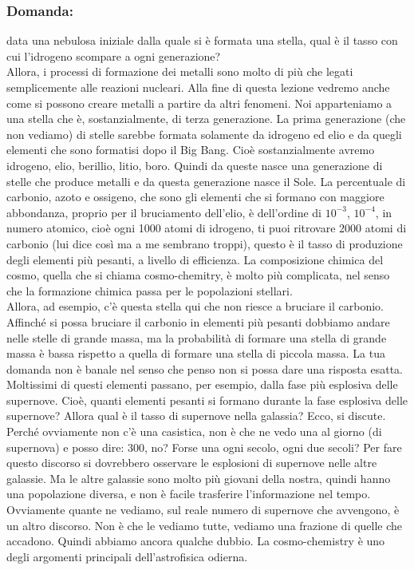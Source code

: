 \documentclass[a4paper,11pt]{article}
\begin{document}
   \subsubsection{Domanda:} data una nebulosa iniziale dalla quale si è formata una stella, qual è il tasso con cui l'idrogeno scompare a ogni generazione? \\ Allora, i processi di formazione dei metalli sono molto di più che legati semplicemente alle reazioni nucleari. Alla fine di questa lezione vedremo anche come si possono creare metalli a partire da altri fenomeni. Noi apparteniamo a una stella che è, sostanzialmente, di terza generazione. La prima generazione (che non vediamo) di stelle sarebbe formata solamente da idrogeno ed elio e da quegli elementi che sono formatisi dopo il Big Bang. Cioè sostanzialmente avremo idrogeno, elio, berillio, litio, boro. Quindi da queste nasce una generazione di stelle che produce metalli e da questa generazione nasce il Sole. La percentuale di carbonio, azoto e ossigeno, che sono gli elementi che si formano con maggiore abbondanza, proprio per il bruciamento dell'elio, è dell'ordine di $10^{-3}$, $10^{-4}$, in numero atomico, cioè ogni 1000 atomi di idrogeno, ti puoi ritrovare 2000 atomi di carbonio (lui dice così ma a me sembrano troppi), questo è il tasso di produzione degli elementi più pesanti, a livello di efficienza. La composizione chimica del cosmo, quella che si chiama cosmo-chemitry, è molto più complicata, nel senso che la formazione chimica passa per le popolazioni stellari.\\ Allora, ad esempio, c'è questa stella qui che non riesce a bruciare il carbonio. Affinché si possa bruciare il carbonio in elementi più pesanti dobbiamo andare nelle stelle di grande massa, ma la probabilità di formare una stella di grande massa è bassa rispetto a quella di formare una stella di piccola massa. La tua domanda non è banale nel senso che penso non si possa dare una risposta esatta. Moltissimi di questi elementi passano, per esempio, dalla fase più esplosiva delle supernove. Cioè, quanti elementi pesanti si formano durante la fase esplosiva delle supernove? Allora qual è il tasso di supernove nella galassia? Ecco, si discute. Perché ovviamente non c'è una casistica, non è che ne vedo una al giorno (di supernova) e posso dire: 300, no? Forse una ogni secolo, ogni due secoli? Per fare questo discorso si dovrebbero osservare le esplosioni di supernove nelle altre galassie. Ma le altre galassie sono molto più giovani della nostra, quindi hanno una popolazione diversa, e non è facile trasferire l'informazione nel tempo. Ovviamente quante ne vediamo, sul reale numero di supernove che avvengono, è un altro discorso. Non è che le vediamo tutte, vediamo una frazione di quelle che accadono. Quindi abbiamo ancora qualche dubbio. La cosmo-chemistry è uno degli argomenti principali dell'astrofisica odierna. \\ 
\end{document}
